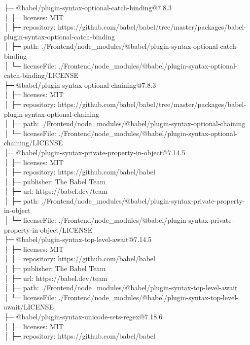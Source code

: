 ├─ @babel/plugin-syntax-optional-catch-binding@7.8.3\\
│  ├─ licenses: MIT\\
│  ├─ repository: https://github.com/babel/babel/tree/master/packages/babel-plugin-syntax-optional-catch-binding\\
│  ├─ path: ./Frontend/node\_modules/@babel/plugin-syntax-optional-catch-binding\\
│  └─ licenseFile: ./Frontend/node\_modules/@babel/plugin-syntax-optional-catch-binding/LICENSE\\
├─ @babel/plugin-syntax-optional-chaining@7.8.3\\
│  ├─ licenses: MIT\\
│  ├─ repository: https://github.com/babel/babel/tree/master/packages/babel-plugin-syntax-optional-chaining\\
│  ├─ path: ./Frontend/node\_modules/@babel/plugin-syntax-optional-chaining\\
│  └─ licenseFile: ./Frontend/node\_modules/@babel/plugin-syntax-optional-chaining/LICENSE\\
├─ @babel/plugin-syntax-private-property-in-object@7.14.5\\
│  ├─ licenses: MIT\\
│  ├─ repository: https://github.com/babel/babel\\
│  ├─ publisher: The Babel Team\\
│  ├─ url: https://babel.dev/team\\
│  ├─ path: ./Frontend/node\_modules/@babel/plugin-syntax-private-property-in-object\\
│  └─ licenseFile: ./Frontend/node\_modules/@babel/plugin-syntax-private-property-in-object/LICENSE\\
├─ @babel/plugin-syntax-top-level-await@7.14.5\\
│  ├─ licenses: MIT\\
│  ├─ repository: https://github.com/babel/babel\\
│  ├─ publisher: The Babel Team\\
│  ├─ url: https://babel.dev/team\\
│  ├─ path: ./Frontend/node\_modules/@babel/plugin-syntax-top-level-await\\
│  └─ licenseFile: ./Frontend/node\_modules/@babel/plugin-syntax-top-level-await/LICENSE\\
├─ @babel/plugin-syntax-unicode-sets-regex@7.18.6\\
│  ├─ licenses: MIT\\
│  ├─ repository: https://github.com/babel/babel\\
